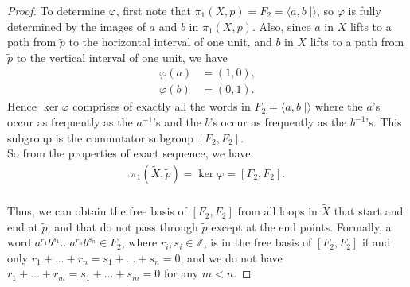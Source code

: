 \documentclass{article}
\begin{document}
\begin{enumerate}[label={\bf Q\arabic*:}]
\begin{proof}
      To determine $\varphi$, first note that $\pi_1(X,p)=F_2=\langle
      a,b\;|\rangle$, so $\varphi$ is fully determined by the images of $a$
      and $b$ in $\pi_1(X,p)$. Also, since $a$ in $X$ lifts to a path from
      $\widetilde{p}$ to the horizontal interval of one unit, and $b$ in
      $X$ lifts to a path from $\widetilde{p}$ to the vertical interval of
      one unit, we have
      \begin{align*}
        \varphi(a)  &=(1,0), \\
        \varphi(b)  &=(0,1).
      \end{align*}
      Hence $\ker\varphi$ comprises of exactly all the words in
      $F_2=\langle a,b\;|\rangle$ where the $a$'s occur as frequently as
      the $a^{-1}$'s and the $b$'s occur as frequently as the $b^{-1}$'s.
      This subgroup is the commutator subgroup $[F_2,F_2]$. \\

      So from the properties of exact sequence, we have
      \begin{align*}
        \pi_1(\widetilde{X},\widetilde{p})=\ker\varphi = [F_2,F_2]. \\
      \end{align*}

      Thus, we can obtain the free basis of $[F_2,F_2]$ from all loops in
      $\widetilde{X}$ that start and end at $\widetilde{p}$, and that do
      not pass through $\widetilde{p}$ except at the end points. Formally,
      a word $a^{r_1}b^{s_1}\ldots a^{r_n}b^{s_n}\in F_2$, where
      $r_i,s_i\in\mathbb{Z}$, is in the free basis of $[F_2,F_2]$ if
      and only $r_1+\ldots+r_n=s_1+\ldots+s_n=0$, and we do not have
      $r_1+\ldots+r_m=s_1+\ldots+s_m=0$ for any $m<n$.
    \end{proof}
\end{enumerate}
\end{document}
